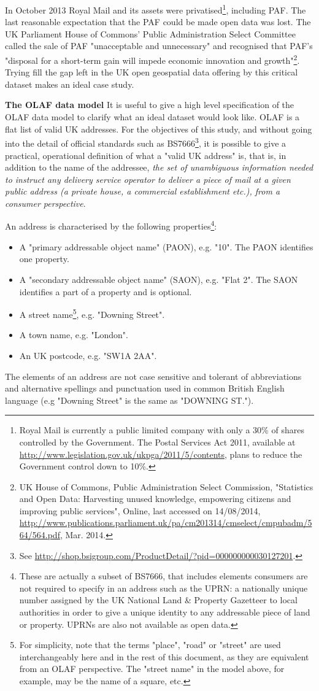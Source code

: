 In October 2013 Royal Mail and its assets were privatised\footnote{Royal Mail is currently a public limited company with only a 30\% of shares controlled by the Government. The Postal Services Act 2011, available at \url{http://www.legislation.gov.uk/ukpga/2011/5/contents}, plans to reduce the Government control down to 10\%.}, including PAF. The last reasonable expectation that the PAF could be made open data was lost. The UK Parliament House of Commons' Public Administration Select Committee called the sale of PAF "unacceptable and unnecessary" and recognised that PAF's "disposal for a short-term gain will impede economic innovation and growth"\footnote{UK House of Commons, Public Administration Select Commission, "Statistics and Open Data: Harvesting unused knowledge, empowering citizens and improving public services", Online, last accessed on 14/08/2014, \url{http://www.publications.parliament.uk/pa/cm201314/cmselect/cmpubadm/564/564.pdf}, Mar. 2014.}. Trying fill the gap left in the UK open geospatial data offering by this critical dataset makes an ideal case study. 

\textbf{The OLAF data model} It is useful to give a high level specification of the OLAF data model to clarify what an ideal dataset would look like. OLAF is a flat list of valid UK addresses. For the objectives of this study, and without going into the detail of official standards such as BS7666\footnote{See \url{http://shop.bsigroup.com/ProductDetail/?pid=000000000030127201}.}, it is possible to give a practical, operational definition of what a "valid UK address" is, that is, in addition to the name of the addressee, {\it the set of unambiguous information needed to instruct any delivery service operator to deliver a piece of mail at a given public address (a private house, a commercial establishment etc.), from a consumer perspective}. 

An address is characterised by the following properties\footnote{These are actually a subset of BS7666, that includes elements consumers are not required to specify in an address such as the UPRN: a nationally unique number assigned by the UK National Land \& Property Gazetteer to local authorities in order to give a unique identity to any addressable piece of land or property. UPRNs are also not available as open data.}:

\begin{itemize}
    \item A "primary addressable object name" (PAON), e.g. "10". The PAON identifies one property.
    \item A "secondary addressable object name" (SAON), e.g. "Flat 2". The SAON identifies a part of a property and is optional.
    \item A street name\footnote{For simplicity, note that the terms "place", "road" or "street" are used interchangeably here and in the rest of this document, as they are equivalent from an OLAF perspective. The "street name" in the model above, for example, may be the name of a square, etc.}, e.g. "Downing Street".
    \item A town name, e.g. "London".
    \item An UK postcode, e.g. "SW1A 2AA".
\end{itemize}

The elements of an address are not case sensitive and tolerant of abbreviations and alternative spellings and punctuation used in common British English language (e.g "Downing Street" is the same as "DOWNING ST.").
